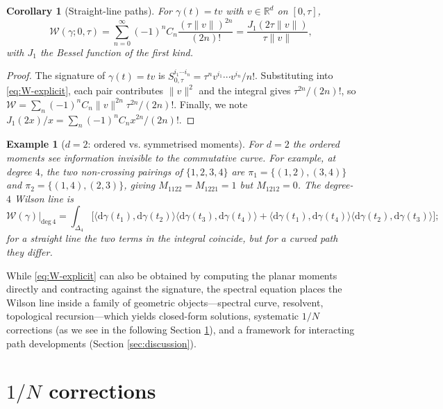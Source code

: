 \documentclass[11pt,a4paper]{article}
\newtheorem{corollary}[theorem]{Corollary}
\newtheorem{example}[theorem]{Example}
\newcommand{\cW}{\mathcal{W}}
\newcommand{\dd}{\mathrm{d}}
\begin{document}
\begin{corollary}[Straight-line paths]\label{cor:bessel}
For $\gamma(t)=tv$ with $v\in\mathbb{R}^d$ on $[0,\tau]$,
\begin{equation}\label{eq:bessel}
  \cW(\gamma;0,\tau) = \sum_{n=0}^{\infty}(-1)^n C_n \frac{(\tau\|v\|)^{2n}}{(2n)!} = \frac{J_1(2\tau\|v\|)}{\tau\|v\|},
\end{equation}
with $J_1$ the Bessel function of the first kind.
\end{corollary}

\begin{proof}
The signature of $\gamma(t)=tv$ is $S^{i_1\cdots i_n}_{0,\tau}=\tau^n v^{i_1}\cdots v^{i_n}/n!$. Substituting into \eqref{eq:W-explicit}, each pair contributes $\|v\|^2$ and the integral gives $\tau^{2n}/(2n)!$, so $\cW=\sum_n(-1)^nC_n\|v\|^{2n}\tau^{2n}/(2n)!$. Finally, we note $J_1(2x)/x%
=\sum_n(-1)^nC_n x^{2n}/(2n)!$.
\end{proof}

\begin{example}[$d=2$: ordered vs. symmetrised moments]\label{ex:d2}
For $d=2$ the ordered moments see information invisible to the commutative curve. For example, at degree $4$, the two non-crossing pairings of $\{1,2,3,4\}$ are $\pi_1=\{(1,2),(3,4)\}$ and $\pi_2=\{(1,4),(2,3)\}$, giving $M_{1122}=M_{1221}=1$ but $M_{1212}=0$. The degree-$4$ Wilson line is
\begin{equation}
  \cW(\gamma)\big|_{\mathrm{deg}\,4}
  = \int_{\Delta_4}\bigl[
  \langle\dd\gamma(t_1),\dd\gamma(t_2)\rangle\langle\dd\gamma(t_3),\dd\gamma(t_4)\rangle
  + \langle\dd\gamma(t_1),\dd\gamma(t_4)\rangle\langle\dd\gamma(t_2),\dd\gamma(t_3)\rangle\bigr];
\end{equation}
for a straight line the two terms in the integral coincide, but for a curved path they differ.
\end{example}


While \eqref{eq:W-explicit} can also be obtained by computing the planar moments directly \cite{nica2006lectures,cass2026free} and contracting against the signature, the spectral equation places the Wilson line inside a family of geometric objects---spectral curve, resolvent, topological recursion---which yields closed-form solutions, systematic $1/N$ corrections (as we see in the following Section \ref{sec:genus}), and a framework for interacting path developments (Section \ref{sec:discussion}).



\section{$1/N$ corrections}\label{sec:genus}
\end{document}

